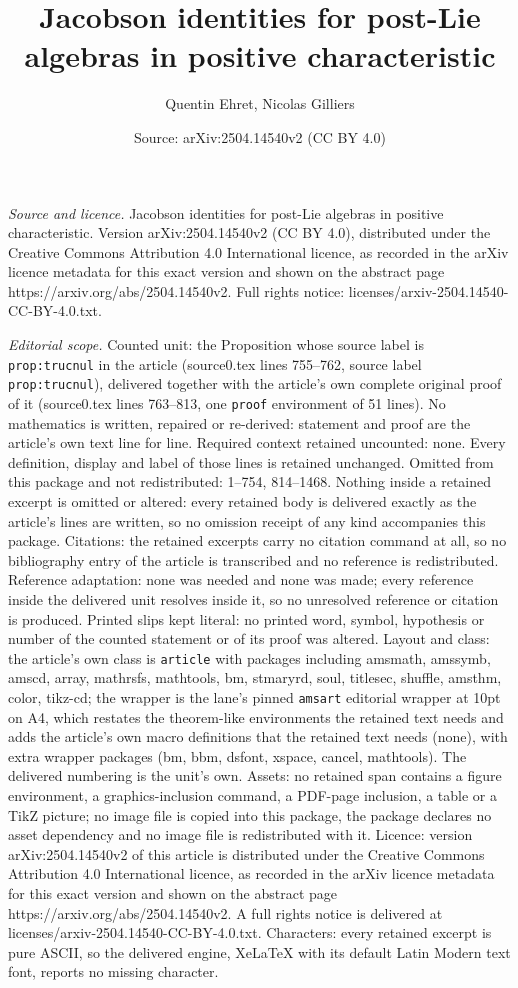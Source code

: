 \documentclass[10pt,a4paper]{amsart}
\title[Jacobson identities for post-Lie algebras in positive charac]{Jacobson identities for post-Lie algebras in positive characteristic}
\author{Quentin Ehret, Nicolas Gilliers}
\date{Source: arXiv:2504.14540v2 (CC BY 4.0)}
\begin{document}
\maketitle

\noindent\emph{Source and licence.} Jacobson identities for post-Lie algebras in positive characteristic. Version arXiv:2504.14540v2 (CC BY 4.0), distributed under the Creative Commons Attribution 4.0 International licence, as recorded in the arXiv licence metadata for this exact version and shown on the abstract page https://arxiv.org/abs/2504.14540v2. Full rights notice: licenses/arxiv-2504.14540-CC-BY-4.0.txt.\par\smallskip

\noindent\textit{Editorial scope.} Counted unit: the Proposition whose source label is \texttt{prop:trucnul} in the article (source0.tex lines 755--762, source label \texttt{prop:trucnul}), delivered together with the article's own complete original proof of it (source0.tex lines 763--813, one \texttt{proof} environment of 51 lines). No mathematics is written, repaired or re-derived: statement and proof are the article's own text line for line. Required context retained uncounted: none. Every definition, display and label of those lines is retained unchanged. Omitted from this package and not redistributed: 1--754, 814--1468. Nothing inside a retained excerpt is omitted or altered: every retained body is delivered exactly as the article's lines are written, so no omission receipt of any kind accompanies this package. Citations: the retained excerpts carry no citation command at all, so no bibliography entry of the article is transcribed and no reference is redistributed. Reference adaptation: none was needed and none was made; every reference inside the delivered unit resolves inside it, so no unresolved reference or citation is produced. Printed slips kept literal: no printed word, symbol, hypothesis or number of the counted statement or of its proof was altered. Layout and class: the article's own class is \texttt{article} with packages including amsmath, amssymb, amscd, array, mathrsfs, mathtools, bm, stmaryrd, soul, titlesec, shuffle, amsthm, color, tikz-cd; the wrapper is the lane's pinned \texttt{amsart} editorial wrapper at 10pt on A4, which restates the theorem-like environments the retained text needs and adds the article's own macro definitions that the retained text needs (none), with extra wrapper packages (bm, bbm, dsfont, xspace, cancel, mathtools). The delivered numbering is the unit's own. Assets: no retained span contains a figure environment, a graphics-inclusion command, a PDF-page inclusion, a table or a TikZ picture; no image file is copied into this package, the package declares no asset dependency and no image file is redistributed with it. Licence: version arXiv:2504.14540v2 of this article is distributed under the Creative Commons Attribution 4.0 International licence, as recorded in the arXiv licence metadata for this exact version and shown on the abstract page https://arxiv.org/abs/2504.14540v2. A full rights notice is delivered at licenses/arxiv-2504.14540-CC-BY-4.0.txt. Characters: every retained excerpt is pure ASCII, so the delivered engine, XeLaTeX with its default Latin Modern text font, reports no missing character.
\end{document}
